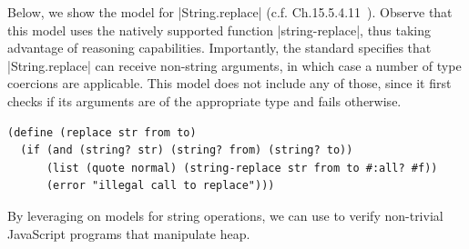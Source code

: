 Below, we show the \rosette model for \jsinline|String.replace| (c.f. Ch.15.5.4.11~\cite{ecma}).
Observe that this model uses the natively supported function \schemeinline|string-replace|, 
thus taking advantage of \rosette reasoning capabilities. 
Importantly, the standard specifies that \jsinline|String.replace| can receive non-string 
arguments, in which case a number of type coercions are applicable. 
This model does not include any of those, since it first checks if its arguments 
are of the appropriate type and fails otherwise. 
\begin{lstlisting}
(define (replace str from to)
  (if (and (string? str) (string? from) (string? to))
      (list (quote normal) (string-replace str from to #:all? #f))
      (error "illegal call to replace")))
\end{lstlisting}


By leveraging on \rosette models for string operations, we can use \jilette to verify 
non-trivial JavaScript programs that manipulate heap.
 
 
 

%






